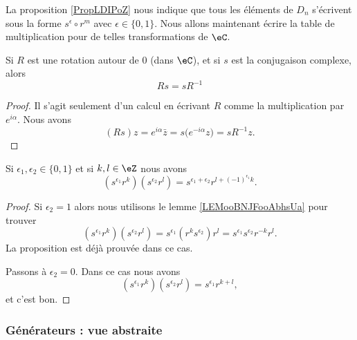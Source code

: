 La proposition \ref{PropLDIPoZ} nous indique que tous les éléments de \( D_n\) s'écrivent sous la forme \( s^{\epsilon}\circ r^m\) avec \( \epsilon\in\{ 0,1 \}\). Nous allons maintenant écrire la table de multiplication pour de telles transformations de \( \eC\).

\begin{lemma}       \label{LEMooBNJFooAbhsUa}
	Si \( R\) est une rotation autour de \( 0\) (dans \( \eC\)), et si \( s\) est la conjugaison complexe, alors
	\begin{equation}
		Rs=sR^{-1}
	\end{equation}
\end{lemma}

\begin{proof}
	Il s'agit seulement d'un calcul en écrivant \( R\) comme la multiplication par \(  e^{i\alpha}\). Nous avons
	\begin{equation}
		(Rs)z= e^{i\alpha}\bar z=s\big(  e^{-i\alpha}z \big)=sR^{-1}z.
	\end{equation}
\end{proof}

\begin{proposition}     \label{PROPooPYDLooLgiUjk}
	Si \( \epsilon_1,\epsilon_2\in\{ 0,1 \}\) et si \( k,l\in \eZ\) nous avons
	\begin{equation}
		(s^{\epsilon_1}r^k)(s^{\epsilon_2}r^l)=s^{\epsilon_1+\epsilon_2}r^{l+(-1)^{\epsilon_1}k}.
	\end{equation}
\end{proposition}

\begin{proof}
	Si \( \epsilon_2=1\) alors nous utilisons le lemme \ref{LEMooBNJFooAbhsUa} pour trouver
	\begin{equation}
		(s^{\epsilon_1}r^k)(s^{\epsilon_2}r^l)=s^{\epsilon_1}(r^ks^{\epsilon_2})r^l=s^{\epsilon_1}s^{\epsilon_2}r^{-k}r^l.
	\end{equation}
	La proposition est déjà prouvée dans ce cas.

	Passons à \( \epsilon_2=0\). Dans ce cas nous avons
	\begin{equation}
		(s^{\epsilon_1}r^k)(s^{\epsilon_2}r^l)=s^{\epsilon_1}r^{k+l},
	\end{equation}
	et c'est bon.
\end{proof}

\subsubsection{Générateurs : vue abstraite}


